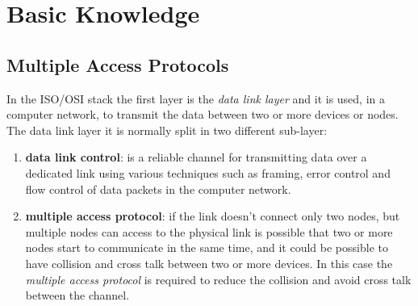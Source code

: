 \section{Basic Knowledge}

\subsection{Multiple Access Protocols}
In the ISO/OSI stack the first layer is the \textit{data link layer} and it is used, in a computer network, to transmit the data between two or more devices or nodes. The data link layer it is normally split in two different sub-layer:
\begin{enumerate}[nosep]
    \item \textbf{data link control}: is a reliable channel for transmitting data over a dedicated link using various techniques such as framing, error control and flow control of data packets in the computer network.
    \item \textbf{multiple access protocol}: if the link doesn't connect only two nodes, but multiple nodes can access to the physical link is possible that two or more nodes start to communicate in the same time, and it could be possible to have collision and cross talk between two or more devices. In this case the \textit{multiple access protocol} is required to reduce the collision and avoid cross talk between the channel.
\end{enumerate}


